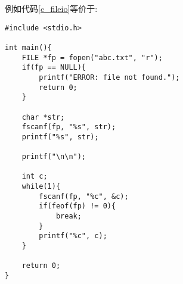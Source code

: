         例如代码\ref{c_fileio}等价于:
\begin{lstlisting}
#include <stdio.h>

int main(){
    FILE *fp = fopen("abc.txt", "r");
    if(fp == NULL){
        printf("ERROR: file not found.");
        return 0;
    }

    char *str;
    fscanf(fp, "%s", str);
    printf("%s", str);

    printf("\n\n");

    int c;
    while(1){
        fscanf(fp, "%c", &c);
        if(feof(fp) != 0){
            break;
        }
        printf("%c", c);
    }

    return 0;
}
\end{lstlisting}